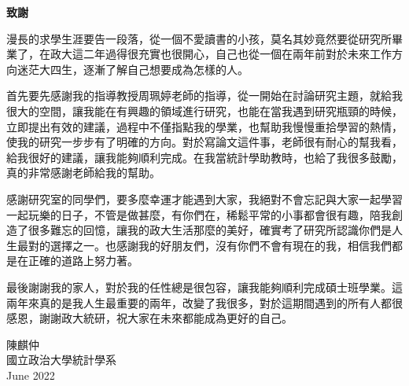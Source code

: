 %
%
%


\newpage
\cleardoublepage

\setlength{\parindent}{2em}
\thispagestyle{empty}

\vspace*{1cm}

\begin{center}
{\Large \bf 致謝}\\[20pt]     
\end{center}

	漫長的求學生涯要告一段落，從一個不愛讀書的小孩，莫名其妙竟然要從研究所畢業了，在政大這二年過得很充實也很開心，自己也從一個在兩年前對於未來工作方向迷茫大四生，逐漸了解自己想要成為怎樣的人。
	
	首先要先感謝我的指導教授\;周珮婷\;老師的指導，從一開始在討論研究主題，就給我很大的空間，讓我能在有興趣的領域進行研究，也能在當我遇到研究瓶頸的時候，立即提出有效的建議，過程中不僅指點我的學業，也幫助我慢慢重拾學習的熱情，使我的研究一步步有了明確的方向。對於寫論文這件事，老師很有耐心的幫我看，給我很好的建議，讓我能夠順利完成。在我當統計學助教時，也給了我很多鼓勵，真的非常感謝老師給我的幫助。
	
	感謝研究室的同學們，要多麼幸運才能遇到大家，我絕對不會忘記與大家一起學習一起玩樂的日子，不管是做甚麼，有你們在，稀鬆平常的小事都會很有趣，陪我創造了很多難忘的回憶，讓我的政大生活那麼的美好，確實考了研究所認識你們是人生最對的選擇之一。也感謝我的好朋友們，沒有你們不會有現在的我，相信我們都是在正確的道路上努力著。

	最後謝謝我的家人，對於我的任性總是很包容，讓我能夠順利完成碩士班學業。這兩年來真的是我人生最重要的兩年，改變了我很多，對於這期間遇到的所有人都很感恩，謝謝政大統研，祝大家在未來都能成為更好的自己。


\begin{flushright} 
{陳麒仲\\ 國立政治大學統計學系\\ June 2022\\}
\end{flushright} 

\vspace*{1cm}



\setlength{\parindent}{2em} 
\thispagestyle{empty}  
\vspace*{1cm}  

